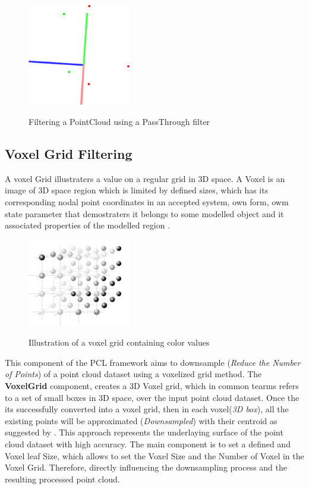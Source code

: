 \documentclass[12pt]{report}
\begin{document}
\begin{figure}[H]%
  \centering
  \includegraphics[width=0.4\textwidth]{passthrough_2.png}
 \caption{Filtering a PointCloud using a PassThrough filter}\cite[]{Rusu_ICRA2011_PCL}
 \label{fig:pass_through} 
\end{figure}

\subsection{Voxel Grid Filtering}

A voxel Grid illustraters a value on a regular grid in 3D space. A Voxel is an image of 3D space region  which is limited by defined sizes, which has its corresponding nodal point coordinates in an accepted system,
own form, owm state parameter that demostraters it belongs to some modelled object and it associated properties of the modelled region . 

\begin{figure}[H]%
  \centering
  \includegraphics[width=0.4\textwidth]{220px-Voxelgitter.png}
 \caption{Illustration of a voxel grid containing color values}\cite[]{SHCHUROVA201576}
 \label{fig:voxel_repre} 
\end{figure}

This component of the PCL  framework aims to downsample (\textit{Reduce the Number of Points}) of a point cloud dataset using a voxelized grid method.
The \textbf{VoxelGrid} component, creates a 3D Voxel grid, which in common tearms refers to a set of small boxes in 3D space, over the input point cloud dataset. 
Once the its successfully converted into a voxel grid, then in each voxel(\textit{3D box}), all the existing points will be approximated (\textit{Downsampled}) with their centroid as suggested by .
This approach represents the underlaying surface of the point cloud dataset with high accuracy.
The main component is to set a defined and Voxel leaf Size, which allows to set the Voxel Size and the Number of Voxel in the Voxel Grid. Therefore, directly influencing the downsampling process and the resulting processed point cloud.
\end{document}
